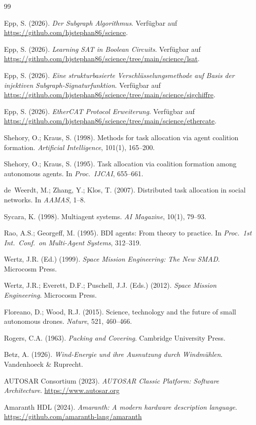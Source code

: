 ﻿\documentclass[a4paper,12pt]{article}
\theoremstyle{definition}
\begin{document}
\begin{thebibliography}{99}

Epp, S. (2026).
\textit{Der Subgraph Algorithmus}. Verfügbar auf
\url{https://github.com/hjstephan86/science}.

Epp, S. (2026).
\textit{Learning SAT in Boolean Circuits}. Verfügbar auf
\url{https://github.com/hjstephan86/science/tree/main/science/lsat}.

Epp, S. (2026).
\textit{Eine strukturbasierte Verschlüsselungsmethode auf Basis der injektiven Subgraph-Signaturfunktion}. Verfügbar auf
\url{https://github.com/hjstephan86/science/tree/main/science/sigchiffre}.

Epp, S. (2026).
\textit{EtherCAT Protocol Erweiterung}.  Verfügbar auf
\url{https://github.com/hjstephan86/science/tree/main/science/ethercate}.

Shehory, O.; Kraus, S. (1998).
Methods for task allocation via agent coalition formation.
\textit{Artificial Intelligence}, 101(1), 165--200.

Shehory, O.; Kraus, S. (1995).
Task allocation via coalition formation among autonomous agents.
In \textit{Proc.\ IJCAI}, 655--661.

de~Weerdt, M.; Zhang, Y.; Klos, T. (2007).
Distributed task allocation in social networks.
In \textit{AAMAS}, 1--8.

Sycara, K. (1998).
Multiagent systems.
\textit{AI Magazine}, 10(1), 79--93.

Rao, A.S.; Georgeff, M. (1995).
BDI agents: From theory to practice.
In \textit{Proc.\ 1st Int.\ Conf.\ on Multi-Agent Systems}, 312--319.

Wertz, J.R. (Ed.) (1999).
\textit{Space Mission Engineering: The New SMAD}.
Microcosm Press.

Wertz, J.R.; Everett, D.F.; Puschell, J.J. (Eds.) (2012).
\textit{Space Mission Engineering}. Microcosm Press.

Floreano, D.; Wood, R.J. (2015).
Science, technology and the future of small autonomous drones.
\textit{Nature}, 521, 460--466.

Rogers, C.A. (1963).
\textit{Packing and Covering}. Cambridge University Press.

Betz, A. (1926).
\textit{Wind-Energie und ihre Ausnutzung durch Windm\"uhlen}.
Vandenhoeck \& Ruprecht.

AUTOSAR Consortium (2023).
\textit{AUTOSAR Classic Platform: Software Architecture}.
\url{https://www.autosar.org}

Amaranth HDL (2024).
\textit{Amaranth: A modern hardware description language}.
\url{https://github.com/amaranth-lang/amaranth}

\end{thebibliography}
\end{document}
